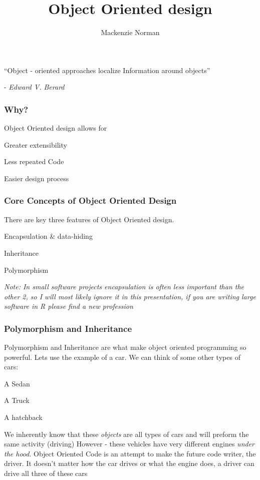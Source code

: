 \documentclass[professionalfont]{beamer}
\title{Object Oriented design }
\author{Mackenzie Norman}
\begin{document}
\frame{\titlepage}

\begin{frame}
\frametitle{}
``Object - oriented approaches localize Information around objects''

        - \textit{Edward V. Berard}\newline

\end{frame}
\begin{frame}
\frametitle{Why?}
Object Oriented design allows for
\begin{list}{- }{}
    \item Greater extensibility
    
    \item Less repeated Code
    \item Easier design process
\end{list}

\end{frame}

\begin{frame}
\frametitle{Core Concepts of Object Oriented Design}
There are key three features of Object Oriented design. 

\begin{list}{- }{}
    \item Encapsulation \& data-hiding
    \item Inheritance
    \item Polymorphism 
\end{list}

\textit{Note: In small software projects encapsulation is often less important than the other 2, so I will most likely ignore it in this presentation, if you are writing large software in R please find a new profession}

\end{frame}


\begin{frame}
    \frametitle{Polymorphism and Inheritance}
    Polymorphism and Inheritance are what make object oriented programming so powerful. Lets use the example of a car. We can think of some other types of cars:
\begin{list}{- }{}
    \item A Sedan
    \item A Truck
    \item A hatchback
\end{list}

We inherently know that these \textit{objects} are all types of cars and will preform the same activity (driving)
However - these vehicles have very different engines \textit{under the hood}. 
Object Oriented Code is an attempt to make the future code writer,  the driver. It doesn't matter how the car drives or what the engine does, a driver can drive all three of these cars

\end{frame}
\end{document}
